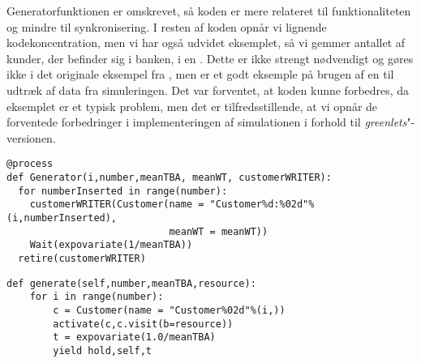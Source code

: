 Generatorfunktionen er omskrevet, så koden er mere relateret til funktionaliteten og mindre til synkronisering.  I resten af koden opnår vi lignende kodekoncentration, men vi har også udvidet eksemplet, så vi gemmer antallet af kunder, der befinder sig i banken, i en . Dette er ikke strengt nødvendigt og gøres ikke i det originale eksempel fra \simpy, men er et godt eksemple på brugen af en  til udtræk af data fra simuleringen. Det var forventet, at koden kunne forbedres, da eksemplet er et typisk \des problem, men det er tilfredsstillende, at vi opnår de forventede forbedringer i implementeringen af simulationen i forhold til \emph{greenlets}"-versionen.


\begin{lstlisting}[firstnumber=20, label=fig:sim:generator, caption=Generatorprocessen for \emph{simulerings}-versionen]
@process
def Generator(i,number,meanTBA, meanWT, customerWRITER):
  for numberInserted in range(number):
    customerWRITER(Customer(name = "Customer%d:%02d"%(i,numberInserted),
                            meanWT = meanWT))
    Wait(expovariate(1/meanTBA))
  retire(customerWRITER)
\end{lstlisting}

\begin{lstlisting}[firstnumber=11, label=fig:simpy:generator, caption=Generator funktion for \simpy]
def generate(self,number,meanTBA,resource):         
    for i in range(number):
        c = Customer(name = "Customer%02d"%(i,))
        activate(c,c.visit(b=resource))              
        t = expovariate(1.0/meanTBA)               
        yield hold,self,t
\end{lstlisting}

